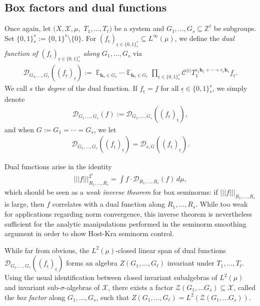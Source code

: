 \documentclass[11pt]{amsart}
\theoremstyle{definition}
\DeclareMathOperator*{\E}{\mathbb{E}}
\newcommand{\Z}{{\mathbb Z}}
\newcommand{\CC}{{\mathcal C}}
\newcommand{\CD}{{\mathcal D}}
\newcommand{\CX}{{\mathcal X}}
\newcommand{\CZ}{{\mathcal Z}}
\newcommand{\bh}{{\mathbf{h}}}
\newcommand{\eps}{\epsilon}
\newcommand{\ueps}{{\underline{\epsilon}}}
\newcommand{\nnorm}[1]{\lvert\!|\!| #1|\!|\!\rvert}
\newcommand{\1}{{\mathbf{1}}}
\begin{document}
\subsection{Box factors and dual functions}\label{AA: box factors}
Once again, let $(X, \CX, \mu,$\! $T_1, \ldots, T_\ell)$ be a system and $G_1, \ldots, G_s\subseteq\Z^\ell$ be subgroups. Set $\{0,1\}^s_* := \{0,1\}^s\setminus\{{0}\}$. For $(f_\ueps)_{\ueps\in \{0,1\}^s_*}\subseteq L^\infty(\mu)$, we define the \emph{dual function of  $(f_\ueps)_{\ueps\in \{0,1\}^s_*}$ along $G_1, \ldots, G_s$} via
\begin{align*}
    \CD_{G_1, \ldots, G_s}((f_\ueps)_\ueps) := \E_{\bh_s\in G_s}\cdots \E_{\bh_1\in G_1} \prod_{\ueps\in\{0,1\}^s_*}\CC^{|\ueps|} T_1^{\eps_1 \bh_1 +\cdots +\eps_s\bh_s}f_\ueps.
\end{align*}
We call $s$ the \emph{degree} of the dual function. If $f_\ueps = f$ for all $\ueps\in\{0,1\}^s_*$, we simply denote
\begin{align*}
    \CD_{G_1, \ldots, G_s}(f) := \CD_{G_1, \ldots, G_s}((f_\ueps)_\ueps),
\end{align*}
and when $G:=G_1 = \cdots = G_s$, we let
\begin{align*}
    \CD_{G_1, \ldots, G_s}((f_\ueps)_\ueps) = \CD_{s, G}((f_\ueps)_\ueps).
\end{align*}

Dual functions arise in the identity
\begin{align}\label{E: dual identity}
        \nnorm{f}_{R_1, \ldots, R_s}^{2^s} = \int f \cdot \CD_{R_1, \ldots, R_s}(f)\, d\mu,
\end{align}
which should be seen as a \emph{weak inverse theorem} for box seminorms: if $\nnorm{f}_{R_1, \ldots, R_s}$ is large, then $f$ correlates with a dual function along $R_1, \ldots, R_s$.
While too weak for applications regarding norm convergence, this inverse theorem is nevertheless sufficient for the analytic manipulations performed in the seminorm smoothing argument in order to show Host-Kra seminorm control.

While far from obvious, the $L^2(\mu)$-closed linear span of dual functions $\CD_{G_1, \ldots, G_s}((f_\ueps)_\ueps)$ forms an algebra $Z(G_1, \ldots, G_\ell)$ invariant under $T_1, \ldots, T_\ell$. Using the usual identification between closed invariant subalgebras of $L^2(\mu)$ and invariant sub-$\sigma$-algebras of $\CX$, there exists a factor $\CZ({G_1, \ldots G_s})\subseteq\CX$, called the \emph{box factor} along $G_1, \ldots, G_s$, such that $Z(G_1, \ldots, G_\ell) = L^2(\CZ({G_1, \ldots G_s}))$.
\end{document}
